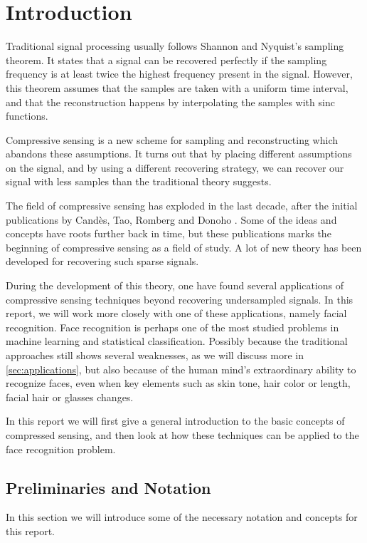 \chapter{Introduction}
Traditional signal processing usually follows Shannon and Nyquist's sampling theorem. It states that a signal can be recovered perfectly if the sampling frequency is at least twice the highest frequency present in the signal.  However, this theorem assumes that the samples are taken with a uniform time interval, and that the reconstruction happens by interpolating the samples with sinc functions. 

Compressive sensing is a new scheme for sampling and reconstructing which abandons these assumptions. It turns out that by placing different assumptions on the signal, and by using a different recovering strategy, we can recover our signal with less samples than the traditional theory suggests. 

The field of compressive sensing has exploded in the last decade, after the initial publications by Cand{\`e}s, Tao, Romberg and Donoho \cite{candes2006near, candes2006robust, donoho2006compressed}. Some of the ideas and concepts have roots further back in time, but these publications marks the beginning of compressive sensing as a field of study. A lot of new theory has been developed for recovering such sparse signals. 

During the development of this theory, one have found several applications of compressive sensing techniques beyond recovering undersampled signals. In this report, we will work more closely with one of these applications, namely facial recognition. Face recognition is perhaps one of the most studied problems in machine learning and statistical classification. Possibly because the traditional approaches still shows several weaknesses, as we will discuss more in \cref{sec:applications}, but also because of the human mind's extraordinary ability to recognize faces, even when key elements such as skin tone, hair color or length, facial hair or glasses changes. 

In this report we will first give a general introduction to the basic concepts of compressed sensing, and then look at how these techniques can be applied to the face recognition problem. 


\section{Preliminaries and Notation}
In this section we will introduce some of the necessary notation and concepts for this report. 

